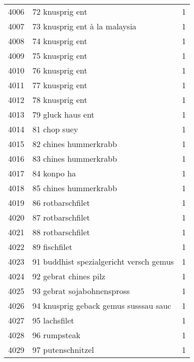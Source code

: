 \begin{tabular}{llr}
4006 &                                    72 knusprig ent &      1 \\
4007 &                      73 knusprig ent à la malaysia &      1 \\
4008 &                                    74 knusprig ent &      1 \\
4009 &                                    75 knusprig ent &      1 \\
4010 &                                    76 knusprig ent &      1 \\
4011 &                                    77 knusprig ent &      1 \\
4012 &                                    78 knusprig ent &      1 \\
4013 &                                  79 gluck haus ent &      1 \\
4014 &                                       81 chop suey &      1 \\
4015 &                              82 chines hummerkrabb &      1 \\
4016 &                              83 chines hummerkrabb &      1 \\
4017 &                                        84 konpo ha &      1 \\
4018 &                              85 chines hummerkrabb &      1 \\
4019 &                                  86 rotbarschfilet &      1 \\
4020 &                                  87 rotbarschfilet &      1 \\
4021 &                                  88 rotbarschfilet &      1 \\
4022 &                                      89 fischfilet &      1 \\
4023 &            91 buddhist spezialgericht versch gemus &      1 \\
4024 &                              92 gebrat chines pilz &      1 \\
4025 &                         93 gebrat sojabohnenspross &      1 \\
4026 &              94 knusprig geback gemus susssau sauc &      1 \\
4027 &                                      95 lachsfilet &      1 \\
4028 &                                       96 rumpsteak &      1 \\
4029 &                                  97 putenschnitzel &      1 \\

\end{tabular}
